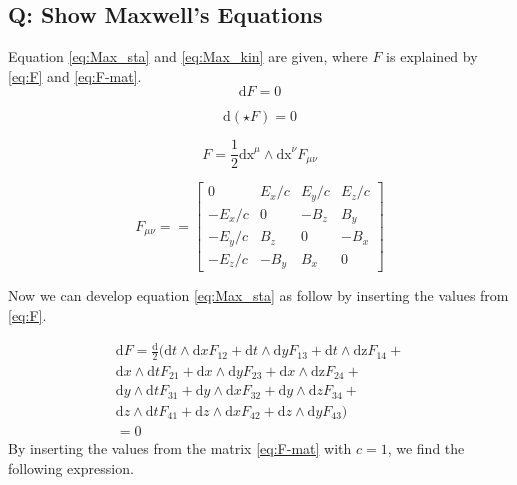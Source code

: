 \subsection{Q: Show Maxwell's Equations}

Equation \ref{eq:Max_sta} and \ref{eq:Max_kin} are given, where $F$ is explained by \ref{eq:F} and \ref{eq:F-mat}. 
\begin{equation}
\mathrm{d} F=0  
\label{eq:Max_sta}
\end{equation} 


\begin{equation}
\mathrm{d} (\star F)=0
\label{eq:Max_kin}
\end{equation}

\begin{equation}
F=\frac{1}{2}\mathrm{d x}^{\mu} \wedge \mathrm{d x}^{\nu} F_{\mu\nu}
\label{eq:F}
\end{equation}


\begin{equation}
F_{\mu\nu} =  = \begin{bmatrix} 0 & E_x/c & E_y/c & E_z/c \\ -E_x/c & 0 & -B_z & B_y \\ -E_y/c & B_z & 0 & -B_x \\ -E_z/c & -B_y & B_x & 0 \end{bmatrix}
\label{eq:F-mat}
\end{equation}   






Now we can develop equation \ref{eq:Max_sta} as follow by inserting the values from \ref{eq:F}. 

\begin{gather*}
\mathrm{d}F=\frac{\mathrm{d}}{2}(\mathrm{d}t \wedge \mathrm{d}x F_{12} + \mathrm{d}t \wedge \mathrm{d}y F_{13}+ \mathrm{d}t \wedge \mathrm{dz} F_{14}+ \\  \mathrm{d}x \wedge \mathrm{d}t F_{21}+\mathrm{d}x \wedge \mathrm{d}y F_{23}+ \mathrm{d}x \wedge \mathrm{dz} F_{24}+ \\\mathrm{d}y\wedge \mathrm{d}t F_{31}+\mathrm{d}y \wedge \mathrm{d}x F_{32}+ \mathrm{d}y \wedge \mathrm{d}z F_{34}+ \\
\mathrm{d}z \wedge \mathrm{d}t F_{41}+\mathrm{d}z \wedge \mathrm{d}x F_{42}+ \mathrm{d}z \wedge \mathrm{d}y F_{43})\\
=0
\end{gather*}
By inserting the values from the matrix \ref{eq:F-mat} with $c=1$, we find the following expression. 

